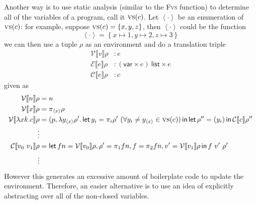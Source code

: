\documentclass[11pt,a4paper]{article}
\newcommand {\coo} [1] {\ensuremath{\operatorname{\mathsf{#1}}}}
\newcommand{\Let}[1]{\coo{let} #1 \coo{in} }
\newcommand{\Rec}[1]{\left\{#1\right\}}
\newcommand{\ba}[1]{\left\langle #1\right\rangle}
\newcommand{\f}[1]{\textsc{#1}}
\newcommand{\g}[1]{\textsf{#1}}
\newcommand{\trans}[2]{\ensuremath{\mathcal{#1}\llbracket #2\rrbracket}}
\begin{document}
\begin{enumerate}[label=\textbf{Excercise \arabic*\ }]
\begin{enumerate}
Another way is to use static analysis (similar to the \f{Fvs} function) to determine all of the variables of a program, call it $\f{vs}(c)$. Let $\ba{\cdot}$ be an enumeration of $\f{vs}(c)$: for example, suppose $\f{vs}(c) = \Rec{x,y,z}$, then $\ba{\cdot}$ could be the function
$$
\ba{\cdot} = \Rec{x \mapsto 1, y \mapsto 2, z \mapsto 3}
$$
we can then use a tuple $\rho$ as an environment and do a translation triple
\begin{align*}
\trans{V}{v} \rho &: e \\
\trans{E}{e} \rho &: (\g{var}\times e)~\g{list} \times e \\
\trans{C}{e} \rho &: c
\end{align*}
given as
\begin{align*}
\trans{V}{n}\rho &= n \\
\trans{V}{x}\rho &= \pi_{\ba{x}}\rho \\
\trans{V}{\lambda xk.c} \rho &= (p, \lambda y_{\ba{x}}\rho'. \Let{y_i = \pi_i \rho' ~ (\forall y_i \ne y_{\ba{x}} \in \f{vs}(c))}{\Let{\rho'' = (y_i)}{\trans{C}{c}\rho''}} \\
\vdots \\
\trans{C}{v_0~v_1}\rho &= \Let{fn = \trans{V}{v_0}\rho, \rho' = \pi_1 fn, f = \pi_2 fn, v' = \trans{V}{v_1}\rho}{f~v'~\rho'} \\
\vdots
\end{align*}
However this generates an excessive amount of boilerplate code to update the environment. Therefore, an easier alternative is to use an idea of explicitly abstracting over all of the non-closed variables.


\end{enumerate}
\end{enumerate}
\end{document}

